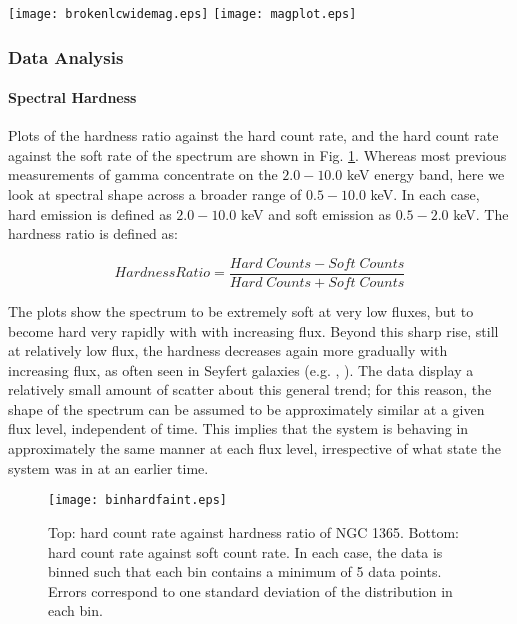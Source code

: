 \documentclass[letters,useAMS,usenatbib]{samnote}
\begin{document}
\begin{figure*}
	\texttt{[image: brokenlcwidemag.eps]}
	\texttt{[image: magplot.eps]}
	\caption{{\it left:} The SWIFT X-ray lightcurve of NGC 1365, with a broken axis where data was not taken. {\it right:} The highlighted section of the light curve,
during
which more intensive {\it SWIFT} monitoring was taking place, expanded.}
	\label{lc}
\end{figure*}

\subsubsection{Data Analysis}

\paragraph{Spectral Hardness}

Plots of the hardness ratio against the hard count rate, and the hard count rate against the soft rate of the spectrum are shown in Fig. \ref{hardness}.
Whereas most previous measurements of gamma concentrate on the $2.0-10.0$ keV energy band, here we look at spectral shape across a broader range of $0.5-10.0$ keV.
In each case, hard emission is defined as $2.0 - 10.0$ keV and soft emission as $0.5-2.0$ keV. The hardness ratio is defined as: 

\begin{equation*}
Hardness Ratio = \frac{Hard\;Counts - Soft\;Counts}{Hard\;Counts + Soft\;Counts}
\end{equation*}
 
 The plots show the spectrum to be extremely soft at very low fluxes, but to become hard very rapidly with with increasing flux. Beyond this sharp rise, still at
relatively low flux, the hardness decreases again more gradually with increasing flux, as often seen in Seyfert galaxies (e.g. \citet{sobolewska}, \citet{lamer}). 
The data display a relatively small amount of scatter about this general trend; for this reason, the shape of the spectrum can be assumed to be approximately similar at a
given flux level, independent of time. This implies that the system is behaving in approximately the same manner at each flux level, irrespective of what state the system
was in at an earlier time.



\begin{figure}
	\centering
	\texttt{[image: binhardfaint.eps]}
	\caption{Top: hard count rate against hardness ratio of NGC 1365. Bottom: hard count rate against soft count rate. 
	In each case, the data is binned such that each bin contains a minimum of 5 data points. Errors correspond to one
	standard deviation of the distribution in each bin.}
	\label{hardness}
\end{figure}
				
\end{document}
